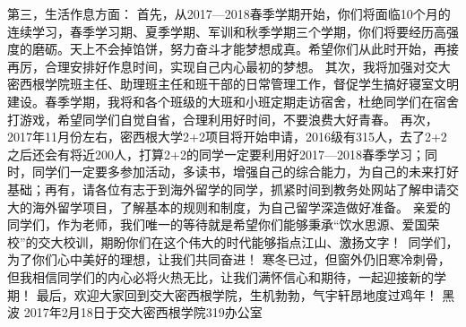 \documentclass[11pt]{article}
\begin{document}
第三，生活作息方面：
 首先，从2017—2018春季学期开始，你们将面临10个月的连续学习，春季学习期、夏季学期、军训和秋季学期三个学期，你们将要经历高强度的磨砺。天上不会掉馅饼，努力奋斗才能梦想成真。希望你们从此时开始，再接再厉，合理安排好作息时间，实现自己内心最初的梦想。
 其次，我将加强对交大密西根学院班主任、助理班主任和班干部的日常管理工作，督促学生搞好寝室文明建设。春季学期，我将和各个班级的大班和小班定期走访宿舍，杜绝同学们在宿舍打游戏，希望同学们自觉自省，合理利用好时间，不要浪费大好青春。
 再次，2017年11月份左右，密西根大学2+2项目将开始申请，2016级有315人，去了2+2之后还会有将近200人，打算2+2的同学一定要利用好2017—2018春季学习；同时，同学们一定要多参加活动，多读书，增强自己的综合能力，为自己的未来打好基础；再有，请各位有志于到海外留学的同学，抓紧时间到教务处网站了解申请交大的海外留学项目，了解基本的规则和制度，为自己留学深造做好准备。
亲爱的同学们，作为老师，我们唯一的等待就是希望你们能够秉承“饮水思源、爱国荣校”的交大校训，期盼你们在这个伟大的时代能够指点江山、激扬文字！ 同学们，为了你们心中美好的理想，让我们共同奋进！
寒冬已过，但窗外仍旧寒冷刺骨，但我相信同学们的内心必将火热无比，让我们满怀信心和期待，一起迎接新的学期！
最后，欢迎大家回到交大密西根学院，生机勃勃，气宇轩昂地度过鸡年！
黑波
2017年2月18日于交大密西根学院319办公室
\end{document}
